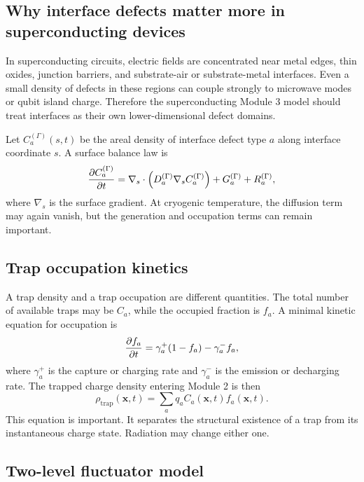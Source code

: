 \documentclass[11pt]{article}
\newcommand{\x}{\mathbf{x}}
\begin{document}
\subsection{Why interface defects matter more in superconducting devices}

In superconducting circuits, electric fields are concentrated near metal edges, thin oxides, junction barriers, and substrate-air or substrate-metal interfaces. Even a small density of defects in these regions can couple strongly to microwave modes or qubit island charge. Therefore the superconducting Module 3 model should treat interfaces as their own lower-dimensional defect domains.

Let $C_a^{(\Gamma)}(s,t)$ be the areal density of interface defect type $a$ along interface coordinate $s$. A surface balance law is
\begin{equation}
\pdv{C_a^{(\Gamma)}}{t}
=\nabla_s\cdot\left(D_a^{(\Gamma)}\nabla_s C_a^{(\Gamma)}\right)
+G_a^{(\Gamma)}+R_a^{(\Gamma)},
\label{eq:surface_defect_balance}
\end{equation}
where $\nabla_s$ is the surface gradient. At cryogenic temperature, the diffusion term may again vanish, but the generation and occupation terms can remain important.

\subsection{Trap occupation kinetics}

A trap density and a trap occupation are different quantities. The total number of available traps may be $C_a$, while the occupied fraction is $f_a$. A minimal kinetic equation for occupation is
\begin{equation}
\pdv{f_a}{t}=\gamma_{a}^{+}(1-f_a)-\gamma_a^{-}f_a,
\label{eq:trap_occupation}
\end{equation}
where $\gamma_a^+$ is the capture or charging rate and $\gamma_a^-$ is the emission or decharging rate. The trapped charge density entering Module 2 is then
\begin{equation}
\rho_{\mathrm{trap}}(\x,t)=\sum_a q_a C_a(\x,t) f_a(\x,t).
\label{eq:trap_charge_density}
\end{equation}
This equation is important. It separates the structural existence of a trap from its instantaneous charge state. Radiation may change either one.

\subsection{Two-level fluctuator model}
\end{document}
